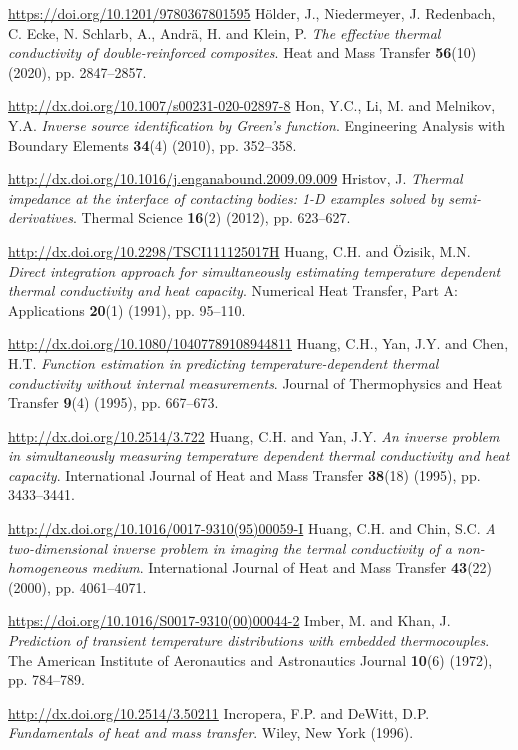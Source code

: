 \begin{thebibliography}{301}
\url{https://doi.org/10.1201/9780367801595}
%
%
 H\"older, J., Niedermeyer, J. Redenbach, C. Ecke, N. Schlarb, A., Andr\"a, H. and Klein, P. {\it The effective thermal conductivity of double-reinforced composites}. Heat and Mass Transfer {\bf 56}(10) (2020), pp. 2847--2857.

\url{http://dx.doi.org/10.1007/s00231-020-02897-8}
%
%
 Hon, Y.C., Li, M. and Melnikov, Y.A. {\it Inverse source identification by Green's function}. Engineering Analysis with Boundary Elements {\bf 34}(4) (2010), pp. 352--358.

\url{http://dx.doi.org/10.1016/j.enganabound.2009.09.009}
%
%
 Hristov, J. {\it Thermal impedance at the interface of contacting bodies: 1-D examples solved by semi-derivatives}. Thermal Science {\bf 16}(2) (2012), pp. 623--627.

\url{http://dx.doi.org/10.2298/TSCI111125017H}
%
%
 Huang, C.H. and \"Ozisik, M.N. {\it Direct integration approach for simultaneously estimating temperature dependent thermal conductivity and heat capacity}. Numerical Heat Transfer, Part A: Applications {\bf 20}(1) (1991), pp. 95--110.

\url{http://dx.doi.org/10.1080/10407789108944811}
%
%
 Huang, C.H., Yan, J.Y. and Chen, H.T. {\it Function estimation in predicting temperature-dependent thermal conductivity without internal measurements}. Journal of Thermophysics and Heat Transfer {\bf 9}(4) (1995), pp. 667--673.

\url{http://dx.doi.org/10.2514/3.722}
%
%
 Huang, C.H. and Yan, J.Y. {\it An inverse problem in simultaneously measuring temperature dependent thermal conductivity and heat capacity}. International Journal of Heat and Mass Transfer {\bf 38}(18) (1995), pp. 3433--3441.

\url{http://dx.doi.org/10.1016/0017-9310(95)00059-I}
%
%
 Huang, C.H. and Chin, S.C. {\it A two-dimensional inverse problem in imaging the termal conductivity of a non-homogeneous medium}. International Journal of Heat and Mass Transfer {\bf 43}(22) (2000), pp. 4061--4071.

\url{https://doi.org/10.1016/S0017-9310(00)00044-2}
%
%
 Imber, M. and Khan, J. {\it Prediction of transient temperature distributions with embedded thermocouples}. The American Institute of Aeronautics and Astronautics Journal {\bf 10}(6) (1972), pp. 784--789.

\url{http://dx.doi.org/10.2514/3.50211}
%
%
 Incropera, F.P. and  DeWitt, D.P. {\it Fundamentals of heat and mass transfer}. Wiley, New York (1996).


\end{thebibliography}
